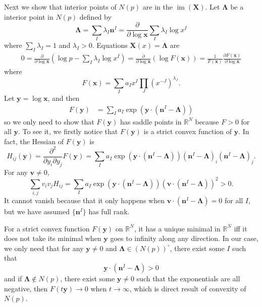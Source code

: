 \documentclass[12pt]{article}
\theoremstyle{definition}
\theoremstyle{plain}
\begin{document}
Next we show that interior points of $N(p)$ are in the $\operatorname{im}(\mathbf{X})$.
Let $\mathbf{\Lambda}$ be a interior point in $N(p)$ defined by 
\[
	\mathbf \Lambda=\sum_{I}\lambda_I\mathbf n^I
	=\frac{\partial}{\partial \log \mathbf x}\sum_{I}\lambda_I \log x^I
\]
where $\sum_I \lambda_I=1$ and $\lambda_I > 0$. Equations $\mathbf X(x)=\mathbf \Lambda$ are 
\[
\begin{aligned}
	0=\frac{\partial }{\partial \log \mathbf x}\left(
	\log p-\sum_{I}\lambda_I \log x^I
	\right)=\frac{\partial }{\partial \log \mathbf x}\left(
	\log F(\mathbf x)
	\right)=\frac{1}{F(\mathbf x)}\frac{\partial F(\mathbf x)}{\partial \log \mathbf x}
\end{aligned}
\]
where
\[
	F(\mathbf x)=\sum_I a_I x^I\prod_J (x^{-J})^{\lambda_J}.
\]
Let $\mathbf y=\log \mathbf x$, and then
\[
	\begin{aligned}
		F(\mathbf y)
		&=\sum_I a_I \exp\left(\mathbf{y}\cdot \left(\mathbf{n}^I-\mathbf{\Lambda}\right)\right)
	\end{aligned}
\]
so we only need to show that $F(\mathbf y)$ has saddle points in $\mathbb R^N$ because $F>0$ for all $\mathbf y$. To see it, we firstly notice that $F(\mathbf y)$ is a strict convex function of $\mathbf y$. In fact, the Hessian of $F(\mathbf y)$ is 
\[
	H_{ij}(\mathbf y)=\frac{\partial^2}{\partial y_i\partial y_j}F(\mathbf y)=\sum_I a_I \exp\left(\mathbf{y}\cdot \left(\mathbf{n}^I-\mathbf{\Lambda}\right)\right)\left(\mathbf{n}^I-\mathbf{\Lambda}\right)_i\left(\mathbf{n}^I-\mathbf{\Lambda}\right)_j.
\]
For any $\mathbf v\neq 0$, 
\[
	\sum_{i,j}v_iv_jH_{ij}=\sum_I a_I \exp\left(\mathbf{y}\cdot \left(\mathbf{n}^I-\mathbf{\Lambda}\right)\right) \left(\mathbf v\cdot (\mathbf{n}^I-\mathbf{\Lambda})\right)^2 >0.
\]
It cannot vanish because that it only happens when $\mathbf v\cdot (\mathbf{n}^I-\mathbf{\Lambda})=0$ for all $I$, but we have assumed $\{\mathbf n^I\}$ has full rank.

For a strict convex function $F(\mathbf y)$ on $\mathbb R^N$, it has a unique minimal in $\mathbb R^N$ iff it does not take its minimal when $\mathbf{y}$ goes to infinity along any direction. In our case, we only need that for any $\mathbf{y}\neq 0$ and $\mathbf\Lambda \in (N(p))^\circ $, there exist some $I$ such that  
\[
	\mathbf{y}\cdot (\mathbf{n}^I-\mathbf{\Lambda})>0
\]
and if $\mathbf\Lambda \not\in N(p)$, there exist some $\mathbf{y}\neq 0$ such that the exponentials are all negative, then $F(t\mathbf y)\to 0$ when $t\to \infty$, which is direct result of convexity of $N(p)$.
\end{document}

